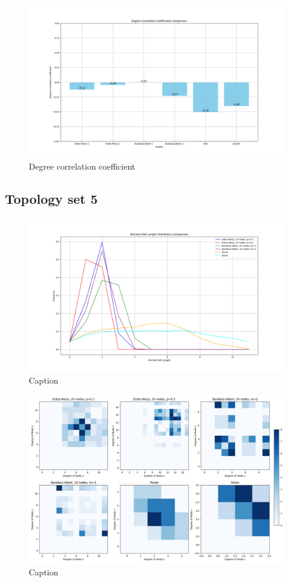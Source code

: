 \begin{figure}
    \centering
    \includegraphics[width=0.9\linewidth]{images/FINAL-TOPO-COMP/Degree-correlation-coeff/deg-coeff-23.png}
    \caption{Degree correlation coefficient}
    \label{fig:enter-label}
\end{figure}

\subsection{Topology set 5}
\begin{figure}
    \centering
    \includegraphics[width=0.9\linewidth]{images/FINAL-TOPO-COMP/line-24.png}
    \caption{Caption}
    \label{fig:enter-label}
\end{figure}

\begin{figure}
    \centering
    \includegraphics[width=0.9\linewidth]{images/FINAL-TOPO-COMP/Degree-correlation-matrices/24-matrix.png}
    \caption{Caption}
    \label{fig:enter-label}
\end{figure}

